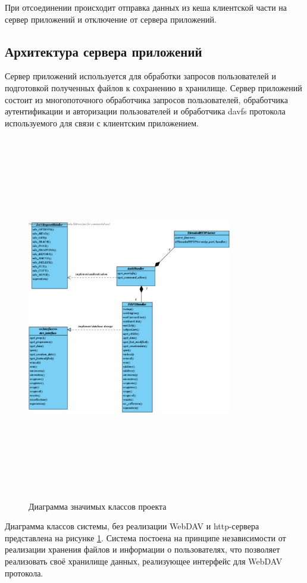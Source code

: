 \documentclass[utf8,usehyperref,12pt]{G7-32}
\begin{document}
При отсоединении происходит отправка данных из кеша клиентской части на сервер приложений и отключение от сервера приложений.

\subsection{Архитектура сервера приложений}

Сервер приложений используется для обработки запросов пользователей и подготовкой полученных файлов к сохранению в хранилище. Сервер приложений состоит из многопоточного обработчика запросов пользователей, обработчика аутентификации и авторизации пользователей и обработчика davfs протокола используемого для связи с клиентским приложением.

\begin{figure}[h!]
   \centering%
   \includegraphics[height=160mm, width=0.8\textwidth, clip, keepaspectratio]{pictures/davstorage}
   \caption{Диаграмма значимых классов проекта}\label{fig:davstorage}
 \end{figure}
 
 Диаграмма классов системы, без реализации WebDAV и http-сервера представлена на рисунке \ref{fig:davstorage}. Система постоена на принципе независимости от реализации хранения файлов и информации о пользователях, что позволяет реализовать своё хранилище данных, реализующее интерфейс для WebDAV протокола.
\end{document}
